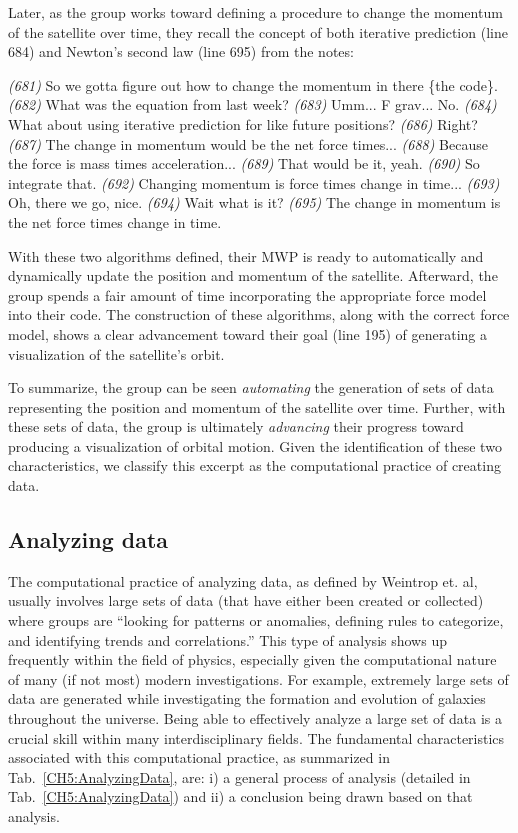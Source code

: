 \documentclass{msuphddissertation}
\begin{document}
\begin{doublespace}
Later, as the group works toward defining a procedure to change the momentum of the satellite over time, they recall the concept of both iterative prediction (line 684) and Newton's second law (line 695) from the notes:
\begin{description}
\SB \textit{(681)} So we gotta figure out how to change the momentum in there \{the code\}.
\SB \textit{(682)} What was the equation from last week?		
\SA \textit{(683)} Umm... F grav... No.
\SD \textit{(684)} What about using iterative prediction for like future positions?
\SD \textit{(686)} Right?
\SC \textit{(687)} The change in momentum would be the net force times...	
\SB \textit{(688)} Because the force is mass times acceleration...
\SC \textit{(689)} That would be it, yeah.
\SB \textit{(690)} So integrate that.
\SC \textit{(692)} Changing momentum is force times change in time...
\SB \textit{(693)} Oh, there we go, nice.
\SA \textit{(694)} Wait what is it?
\SB \textit{(695)} The change in momentum is the net force times change in time.
\end{description}  With these two algorithms defined, their MWP is ready to automatically and dynamically update the position and momentum of the satellite.  Afterward, the group spends a fair amount of time incorporating the appropriate force model into their code.  The construction of these algorithms, along with the correct force model, shows a clear advancement toward their goal (line 195) of generating a visualization of the satellite's orbit.

To summarize, the group can be seen \textit{automating} the generation of sets of data representing the position and momentum of the satellite over time.  Further, with these sets of data, the group is ultimately \textit{advancing} their progress toward producing a visualization of orbital motion.  Given the identification of these two characteristics, we classify this excerpt as the computational practice of creating data.

\subsection{Analyzing data}\label{CH5:SecAnalyzingData}

The computational practice of analyzing data, as defined by Weintrop et. al, usually involves large sets of data (that have either been created or collected) where groups are ``looking for patterns or anomalies, defining rules to categorize, and identifying trends and correlations.''  This type of analysis shows up frequently within the field of physics, especially given the computational nature of many (if not most) modern investigations.  For example, extremely large sets of data are generated while investigating the formation and evolution of galaxies throughout the universe.  Being able to effectively analyze a large set of data is a crucial skill within many interdisciplinary fields.  The fundamental characteristics associated with this computational practice, as summarized in Tab.~\ref{CH5:AnalyzingData}, are: i) a general process of analysis (detailed in Tab.~\ref{CH5:AnalyzingData}) and ii) a conclusion being drawn based on that analysis.


\end{doublespace}
\end{document}
